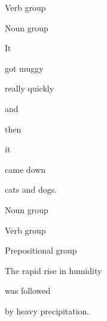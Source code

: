 \documentclass[letterpaper,10pt,english]{sphinxmanual}
\begin{document}
\begin{enumerate}
Verb group





Noun group









It





got muggy





really quickly





and





then





it





came down





cats and dogs.





















Noun group





Verb group





Prepositional group









The rapid rise in humidity





was followed





by heavy precipitation.









\end{enumerate}
\end{document}
